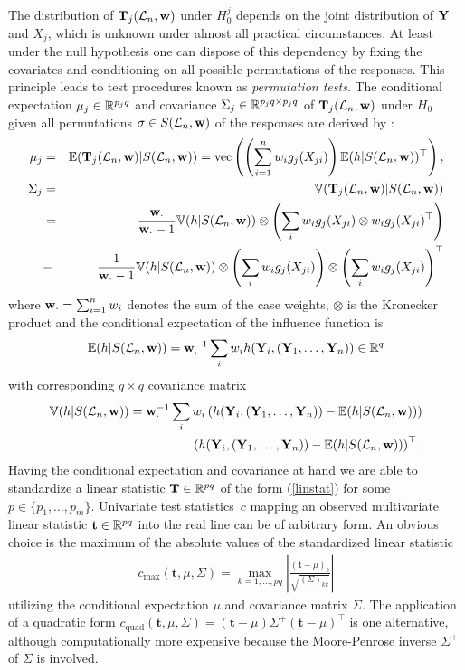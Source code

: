 \documentclass[letter]{article}
\newcommand{\bft}{\mathbf{t}}
\begin{document}
The distribution of $\mathbf{T}_j(\mathcal{L}_n, \mathbf{w})$ under $H_0^j$ depends on the joint
distribution of $\mathbf{Y}$ and $X_j$, which is unknown under almost all practical
circumstances. At least under the null hypothesis one can dispose of this
dependency by fixing the covariates and conditioning on all possible 
permutations of the responses. This principle leads to test procedures known
as \textit{permutation tests}. 
The conditional expectation $\mu_j \in \mathbb{R}^{p_jq}$ and covariance $\Sigma_j
\in \mathbb{R}^{p_jq \times p_jq}$ of $\mathbf{T}_j(\mathcal{L}_n, \mathbf{w})$ under $H_0$ given
all permutations $\sigma \in S(\mathcal{L}_n, \mathbf{w})$ of the responses are derived by
\cite{StrasserWeber1999}: 
\begin{eqnarray}
\mu_j & = & \mathbb{E}(\mathbf{T}_j(\mathcal{L}_n, \mathbf{w}) | S(\mathcal{L}_n, \mathbf{w})) = 
\text{vec} \left( \left( \sum_{i = 1}^n w_i g_j(X_{ji}) \right) \mathbb{E}(h | S(\mathcal{L}_n,
\mathbf{w}))^\top
\right), \nonumber \\
\Sigma_j & = & \mathbb{V}(\mathbf{T}_j(\mathcal{L}_n, \mathbf{w}) | S(\mathcal{L}_n, \mathbf{w})) \nonumber \\
& = & 
    \frac{\mathbf{w}_\cdot}{\mathbf{w}_\cdot - 1}  \mathbb{V}(h | S(\mathcal{L}_n, \mathbf{w})) \otimes
        \left(\sum_i w_i  g_j(X_{ji}) \otimes w_i  g_j(X_{ji})^\top \right) \label{expectcovar}
\\
& - & \frac{1}{\mathbf{w}_\cdot - 1}  \mathbb{V}(h | S(\mathcal{L}_n, \mathbf{w}))  \otimes \left(
        \sum_i w_i g_j(X_{ji}) \right)
\otimes \left( \sum_i w_i g_j(X_{ji})\right)^\top 
\nonumber
\end{eqnarray}
where $\mathbf{w}_\cdot = \sum_{i = 1}^n w_i$ denotes the sum of the case weights,
$\otimes$ is the Kronecker product and the conditional expectation of the
influence function is 
\begin{eqnarray*}
\mathbb{E}(h | S(\mathcal{L}_n, \mathbf{w})) = \mathbf{w}_\cdot^{-1} \sum_i w_i h(\mathbf{Y}_i, (\mathbf{Y}_1, \dots, \mathbf{Y}_n)) \in
\mathbb{R}^q
\end{eqnarray*} 
with corresponding $q \times q$ covariance matrix
\begin{eqnarray*}
\mathbb{V}(h | S(\mathcal{L}_n, \mathbf{w})) = \mathbf{w}_\cdot^{-1} \sum_i w_i \left(h(\mathbf{Y}_i, (\mathbf{Y}_1, \dots, \mathbf{Y}_n)) - \mathbb{E}(h | S(\mathcal{L}_n, \mathbf{w}))
\right) \\
\left(h(\mathbf{Y}_i, (\mathbf{Y}_1, \dots, \mathbf{Y}_n)) - \mathbb{E}(h | S(\mathcal{L}_n, \mathbf{w}))\right)^\top.
\end{eqnarray*}
Having the conditional expectation and covariance at hand we are able to
standardize a linear statistic $\mathbf{T} \in \mathbb{R}^{pq}$ of the form
(\ref{linstat}) for some $p \in \{p_1, \dots, p_m\}$. 
Univariate test statistics~$c$ mapping an observed multivariate 
linear statistic $\bft \in
\R^{pq}$ into the real line can be of arbitrary form.  An obvious choice is
the maximum of the absolute values of the standardized linear statistic
\begin{eqnarray*}
c_\text{max}(\bft, \mu, \Sigma)  = \max_{k = 1, \dots, pq} \left| \frac{(\bft -
\mu)_k}{\sqrt{(\Sigma)_{kk}}} \right|
\end{eqnarray*}
utilizing the conditional expectation $\mu$ and covariance matrix
$\Sigma$. The application of a quadratic form $c_\text{quad}(\bft, \mu, \Sigma)  = 
(\bft - \mu) \Sigma^+ (\bft - \mu)^\top$ is one alternative, although
computationally more expensive because the Moore-Penrose 
inverse $\Sigma^+$ of $\Sigma$ is involved.
\end{document}

